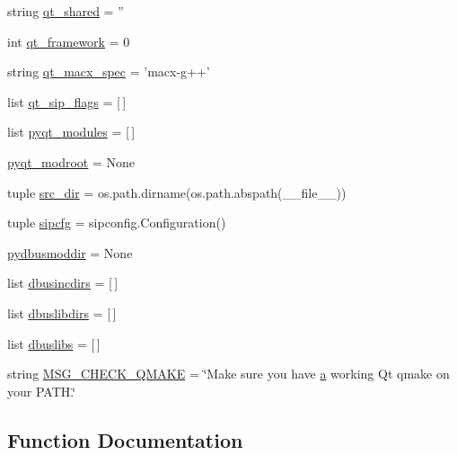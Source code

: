 \begin{DoxyCompactItemize}
\item 
string \hyperlink{namespacePyQt-x11-gpl-4_811_82_1_1configure_a605f9c87700d3917abae9629708c1177}{qt\+\_\+shared} = ''
\item 
int \hyperlink{namespacePyQt-x11-gpl-4_811_82_1_1configure_aea1401d9dc28675c693d01ec9b0e9744}{qt\+\_\+framework} = 0
\item 
string \hyperlink{namespacePyQt-x11-gpl-4_811_82_1_1configure_aab7bbcc1a06be93f7cc16614b57609ad}{qt\+\_\+macx\+\_\+spec} = 'macx-\/g++'
\item 
list \hyperlink{namespacePyQt-x11-gpl-4_811_82_1_1configure_ac25d711846d3aadc505ff3bfdf199772}{qt\+\_\+sip\+\_\+flags} = \mbox{[}$\,$\mbox{]}
\item 
list \hyperlink{namespacePyQt-x11-gpl-4_811_82_1_1configure_a3e12009b95d1e250af755687d4db576d}{pyqt\+\_\+modules} = \mbox{[}$\,$\mbox{]}
\item 
\hyperlink{namespacePyQt-x11-gpl-4_811_82_1_1configure_a25a6a9dd0da74fb4c05b764e2fe1d87d}{pyqt\+\_\+modroot} = None
\item 
tuple \hyperlink{namespacePyQt-x11-gpl-4_811_82_1_1configure_a55925707f92336448006957d79549012}{src\+\_\+dir} = os.\+path.\+dirname(os.\+path.\+abspath(\+\_\+\+\_\+file\+\_\+\+\_\+))
\item 
tuple \hyperlink{namespacePyQt-x11-gpl-4_811_82_1_1configure_a94c495e7961ff09074c85faefd8157ee}{sipcfg} = sipconfig.\+Configuration()
\item 
\hyperlink{namespacePyQt-x11-gpl-4_811_82_1_1configure_a74569b4143687b5065e2df389733b69e}{pydbusmoddir} = None
\item 
list \hyperlink{namespacePyQt-x11-gpl-4_811_82_1_1configure_acd257b30787ecaa31917120c2d2b2e35}{dbusincdirs} = \mbox{[}$\,$\mbox{]}
\item 
list \hyperlink{namespacePyQt-x11-gpl-4_811_82_1_1configure_a2631a57397e06bf60ddbc61c08e19c5b}{dbuslibdirs} = \mbox{[}$\,$\mbox{]}
\item 
list \hyperlink{namespacePyQt-x11-gpl-4_811_82_1_1configure_a917c9c7930b1ecdf0dc2167df01ed46b}{dbuslibs} = \mbox{[}$\,$\mbox{]}
\item 
string \hyperlink{namespacePyQt-x11-gpl-4_811_82_1_1configure_a14e2d019374ab411152e5d2dd964de52}{M\+S\+G\+\_\+\+C\+H\+E\+C\+K\+\_\+\+Q\+M\+A\+K\+E} = \char`\"{}Make sure you have \hyperlink{gen__mat5files_8m_aae328bf20413f220e38aec4d95bfd6da}{a} working Qt qmake on your P\+A\+T\+H.\char`\"{}
\end{DoxyCompactItemize}


\subsection{Function Documentation}
\hypertarget{namespacePyQt-x11-gpl-4_811_82_1_1configure_aef7c2b70344c4732e3c8f0281cd201b5}{}

